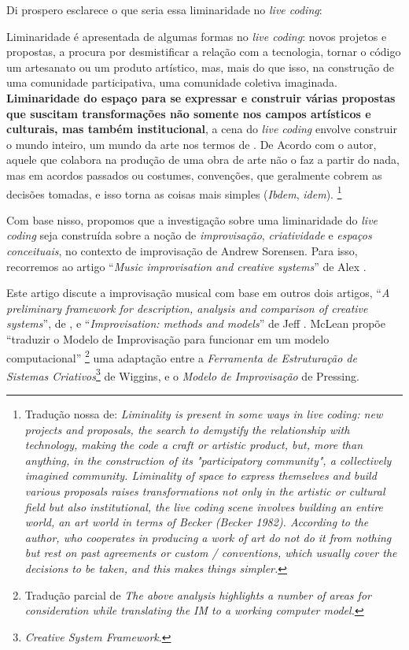 Di prospero esclarece o que seria essa liminaridade no \emph{live coding}: 

\begin{citacao}
Liminaridade é apresentada de algumas formas no \emph{live coding}: novos projetos e propostas, a procura por desmistificar a relação com a tecnologia, tornar o código um artesanato ou um produto artístico, mas, mais do que isso, na construção de uma comunidade participativa, uma comunidade coletiva imaginada. \textbf{Liminaridade do espaço para se expressar e construir várias propostas que suscitam transformações não somente nos campos artísticos e culturais, mas também institucional}, a cena do \emph{live coding} envolve construir o mundo inteiro, um mundo da arte nos termos de . De Acordo com o autor, aquele que colabora na produção de uma obra de arte não o faz a partir do nada, mas em acordos passados ou costumes, convenções, que geralmente cobrem as decisões tomadas, e isso torna as coisas mais simples (\emph{Ibdem}, \emph{idem}). \footnote{Tradução nossa de: \emph{Liminality is present in some ways in live coding: new projects and proposals, the search to demystify the relationship with technology, making the code a craft or artistic product, but, more than anything, in the construction of its "participatory community", a collectively imagined community. Liminality of space to express themselves and build various proposals raises transformations not only in the artistic or cultural field but also institutional, the live coding scene involves building an entire world, an art world in terms of Becker (Becker 1982). According to the author, who cooperates in producing a work of art do not do it from nothing but rest on past agreements or custom / conventions, which usually cover the decisions to be taken, and this makes things simpler.}}
\end{citacao} 

Com base nisso, propomos que a investigação sobre uma liminaridade do \emph{live coding} seja construída sobre a noção de \emph{improvisação}, \emph{criatividade} e \emph{espaços conceituais}, no contexto de improvisação de Andrew Sorensen.  Para isso, recorremos ao artigo ``\emph{Music improvisation and creative systems}'' de Alex .

Este artigo discute a improvisação musical com base em outros dois artigos, ``\emph{A preliminary framework for description, analysis and comparison of creative systems}'', de , e ``\emph{Improvisation: methods and models}'' de Jeff . McLean propõe ``traduzir o Modelo de Improvisação para funcionar em um modelo computacional'' \cite[p.~5]{mclean_music_2006}\footnote{Tradução parcial de \emph{The above analysis highlights a number of areas for consideration while translating the IM to a working computer model.}} uma adaptação entre a \emph{Ferramenta de Estruturação de Sistemas Criativos}\footnote{\emph{Creative System Framework}.} de Wiggins, e o \emph{Modelo de Improvisação} de Pressing.


